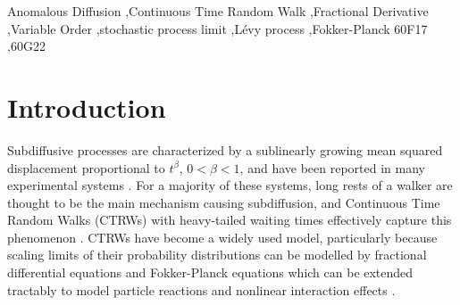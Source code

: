 \documentclass[a4paper,12pt]{elsarticle}
\numberwithin{equation}{section}
\theoremstyle{plain}
\theoremstyle{definition}
\theoremstyle{remark}
\numberwithin{equation}{section}
\newcommand{\1}{\mathbf 1}
\begin{document}
\begin{frontmatter}



\begin{keyword}
Anomalous Diffusion \sep Continuous Time Random Walk \sep Fractional Derivative \sep Variable Order \sep stochastic process limit \sep L\'evy process \sep Fokker-Planck
\MSC[2010] 60F17 \sep  60G22
\end{keyword}

\end{frontmatter}


\section{Introduction}

Subdiffusive processes are characterized by a sublinearly growing mean squared
displacement proportional to $t^\beta$, $0 < \beta < 1$, and have been reported
in many experimental systems
\cite{Metzler2000,TMT04,Santamaria2006a,Banks2005,Regner2013}.
For a majority of these systems, long rests of a walker are thought to be the
main mechanism causing subdiffusion, and Continuous Time Random Walks (CTRWs)
with heavy-tailed waiting times effectively capture this phenomenon
\cite{Scher1975,BG1990,Metzler2000}.  CTRWs have become a widely used model,
particularly because scaling limits of their probability distributions can be
modelled by fractional differential equations and Fokker-Planck equations
\cite{BMK00,Baeumer2001,HLS10PRL,Hahn11} which can be extended tractably to
model particle reactions \cite{Langlands2008d,Angstmann2013} and nonlinear
interaction effects \cite{StrakaFedotov14}.
\end{document}
